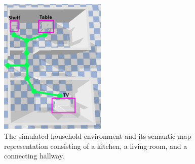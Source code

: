 \documentclass[../report.tex]{subfiles}
\begin{document}
\begin{figure}[h!]
	\centering
	\includegraphics[width=0.45\textwidth]{figures/environment.png}
	\caption{The simulated household environment and its semantic map representation consisting of a kitchen, a living room, and a connecting hallway.}
	\label{fig:environment}
\end{figure}
\end{document}
